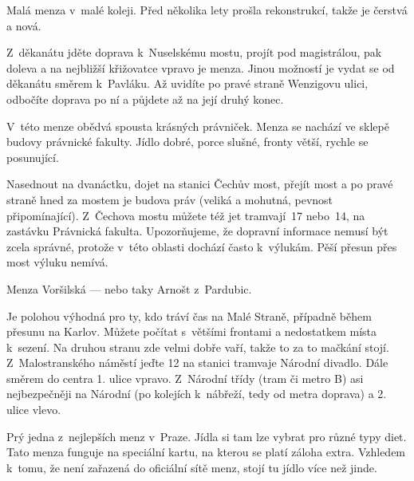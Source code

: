 Malá menza v~malé koleji. Před
několika lety prošla rekonstrukcí, takže je čerstvá a nová.

Z~děkanátu jděte doprava k~Nuselskému mostu, projít pod magistrálou,
pak doleva a na nejbližší křižovatce vpravo je menza. Jinou
možností je vydat se od děkanátu směrem k~Pavláku. Až uvidíte po
pravé straně Wenzigovu ulici, odbočíte doprava po ní a půjdete až
na její druhý konec.

V~této menze obědvá spousta
krásných právniček. Menza se nachází ve sklepě budovy právnické
fakulty. Jídlo dobré, porce slušné, fronty větší, rychle se
posunující. 

Nasednout na
dvanáctku, dojet na stanici Čechův most, přejít most a po pravé
straně hned za mostem je budova práv (veliká a mohutná, pevnost
připomínající). Z~Čechova mostu můžete též jet tramvají~17
nebo~14, na zastávku Právnická fakulta. Upozorňujeme, že dopravní
informace nemusí být zcela správné, protože v~této oblasti dochází
často k~výlukám. Pěší přesun přes most výluku nemívá.

Menza Voršilská --- nebo taky Arnošt z~Pardubic.

Je polohou výhodná pro ty, kdo tráví čas na Malé Straně, případně během přesunu na Karlov.
Můžete počítat s~většími frontami a nedostatkem místa k~sezení.
Na druhou stranu zde velmi dobře vaří, takže to za to mačkání stojí.
Z~Malostranského náměstí jeďte 12 na stanici tramvaje Národní divadlo. Dále směrem do centra 1. ulice vpravo.
Z~Národní třídy (tram či metro B) asi nejbezpečněji na Národní (po kolejích k~nábřeží, tedy od metra doprava) a 2. ulice vlevo.

Prý jedna z~nejlepších menz v~Praze. Jídla si tam
lze vybrat pro různé typy diet. Tato menza funguje na speciální kartu, na kterou se platí záloha extra. Vzhledem k~tomu,
že není zařazená do oficiální sítě menz, stojí tu jídlo více než
jinde.
